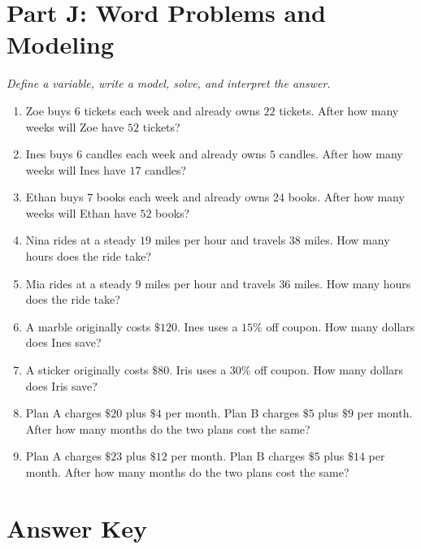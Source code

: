\documentclass[11pt]{article}
\begin{document}
\section*{Part J: Word Problems and Modeling}
\noindent\textit{Define a variable, write a model, solve, and interpret the answer.}
\begin{enumerate}
  \item Zoe buys $6$ tickets each week and already owns $22$ tickets. After how many weeks will Zoe have $52$ tickets?
  \vspace{2.0cm}
  \item Ines buys $6$ candles each week and already owns $5$ candles. After how many weeks will Ines have $17$ candles?
  \vspace{2.0cm}
  \item Ethan buys $7$ books each week and already owns $24$ books. After how many weeks will Ethan have $52$ books?
  \vspace{2.0cm}
  \item Nina rides at a steady $19$ miles per hour and travels $38$ miles. How many hours does the ride take?
  \vspace{2.0cm}
  \item Mia rides at a steady $9$ miles per hour and travels $36$ miles. How many hours does the ride take?
  \vspace{2.0cm}
  \item A marble originally costs $\$120$. Ines uses a $15\%$ off coupon. How many dollars does Ines save?
  \vspace{2.0cm}
  \item A sticker originally costs $\$80$. Iris uses a $30\%$ off coupon. How many dollars does Iris save?
  \vspace{2.0cm}
  \item Plan A charges $\$20$ plus $\$4$ per month. Plan B charges $\$5$ plus $\$9$ per month. After how many months do the two plans cost the same?
  \vspace{2.0cm}
  \item Plan A charges $\$23$ plus $\$12$ per month. Plan B charges $\$5$ plus $\$14$ per month. After how many months do the two plans cost the same?
  \vspace{2.0cm}
\end{enumerate}

\newpage
{}
\section*{Answer Key}
\end{document}
